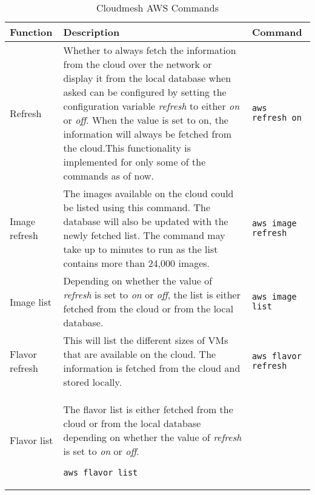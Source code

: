 \documentclass[9pt,twocolumn,twoside]{../../styles/osajnl}
\begin{document}
\begin{table*}[p]
\caption{Cloudmesh AWS Commands}\label{T:aws-commands} 
\begin{center}
\begin{tabular}{p{2cm}p{10cm}p{5cm}}
  Function & Description & Command \\
  \hline
  Refresh &
            Whether to always fetch the information from the cloud
            over the network or display it from the local database when asked
            can be configured by setting the configuration variable {\it refresh} to
            either {\it on} or {\it off}. When the value is set to on, the information
            will always be fetched from the cloud.This functionality is
            implemented for only some of the commands as of now.
                         & \verb+aws refresh on+ \\
  \hline
  Image refresh&
                 The images available on the cloud could be listed
                 using this command. The database will also be updated with the newly
                 fetched list. The command may take up to minutes to run as the list
                 contains more than 24,000 images. 
    & \verb+aws image refresh+ \\
\hline
Image list & Depending on whether the value of {\it refresh} is
      set to {\it on} or {\it off}, the list is either fetched from the
      cloud or from the local database. &
    \verb+aws image list+\\
\hline	
Flavor refresh & This will list the different sizes of VMs
                   that are available on the cloud. The information is fetched from
                   the cloud and stored locally. & 
                                                   \verb+aws flavor refresh+ \\ 
\hline
Flavor list & The flavor list is either fetched from the
      cloud or from the local database depending on whether the
      value of {\it refresh} is set to {\it on} or {\it off}.
	
    \verb+aws flavor list+ \\
	

\end{tabular}
\end{center}
\end{table*}
\end{document}
